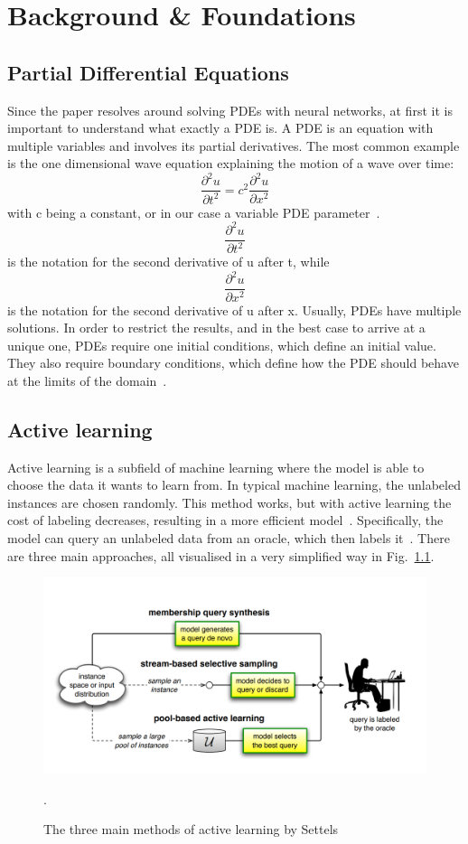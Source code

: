 \chapter{Background \& Foundations}\label{chap:k2}

\section{Partial Differential Equations}
Since the paper resolves around solving PDEs with neural networks, 
at first it is important to understand what exactly a PDE is. 
A PDE is an equation with multiple variables and involves its partial derivatives. 
The most common example is the one dimensional wave equation explaining the motion of a wave over time: 
\[\frac{\partial^2u}{\partial t^2} = c^2 \frac{\partial^2u}{\partial x^2}\]
with c being a constant, or in our case a variable PDE parameter~\cite{olver2014introduction}. \\
\[\frac{\partial^2u}{\partial t^2}\] 
is the notation for the second derivative of u after t, while 
\[\frac{\partial^2u}{\partial x^2}\] 
is the notation for the second derivative of u after x. 
Usually, PDEs have multiple solutions. 
In order to restrict the results, and in the best case to arrive at a unique one, 
PDEs require one initial conditions, which define an initial value. 
They also require boundary conditions, 
which define how the PDE should behave at the limits of the domain~\cite{borthwick2017introduction}.
\section{Active learning}
Active learning is a subfield of machine learning 
where the model is able to choose the data it wants to learn from. 
In typical machine learning, the unlabeled instances are chosen randomly. 
This method works, but with active learning the cost of labeling decreases, 
resulting in a more efficient model~\cite{ramirez2017active}.
 Specifically, the model can query an unlabeled data from an oracle,
  which then labels it~\cite{settles2009active}. 
There are three main approaches, all 
visualised in a very simplified way in Fig.~\ref{fig:AL-overview}. 
\begin{figure}
    \centering
    \includegraphics[width=1\linewidth]{../graphics/active_learning.png}
    \caption{The three main methods of active learning by Settels~\cite{settles2009active}}.
    \label{fig:AL-overview}
\end{figure}
